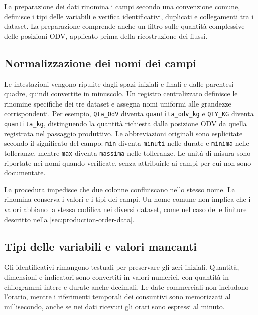 La preparazione dei dati rinomina i campi secondo una convenzione comune, definisce i tipi delle variabili e verifica identificativi, duplicati e collegamenti tra i dataset. La preparazione comprende anche un filtro sulle quantità complessive delle posizioni ODV, applicato prima della ricostruzione dei flussi.

\subsection{Normalizzazione dei nomi dei campi}
\label{sec:feature-name-normalization}

Le intestazioni vengono ripulite dagli spazi iniziali e finali e dalle parentesi quadre, quindi convertite in minuscolo. Un registro centralizzato definisce le rinomine specifiche dei tre dataset e assegna nomi uniformi alle grandezze corrispondenti. Per esempio, \texttt{Qta\_OdV} diventa \texttt{quantita\_odv\_kg} e \texttt{QTY\_KG} diventa \texttt{quantita\_kg}, distinguendo la quantità richiesta dalla posizione ODV da quella registrata nel passaggio produttivo. Le abbreviazioni originali sono esplicitate secondo il significato del campo: \texttt{min} diventa \texttt{minuti} nelle durate e \texttt{minima} nelle tolleranze, mentre \texttt{max} diventa \texttt{massima} nelle tolleranze. Le unità di misura sono riportate nei nomi quando verificate, senza attribuirle ai campi per cui non sono documentate.

La procedura impedisce che due colonne confluiscano nello stesso nome. La rinomina conserva i valori e i tipi dei campi. Un nome comune non implica che i valori abbiano la stessa codifica nei diversi dataset, come nel caso delle finiture descritto nella \cref{sec:production-order-data}.

\subsection{Tipi delle variabili e valori mancanti}
\label{sec:data-types-and-missing-values}

Gli identificativi rimangono testuali per preservare gli zeri iniziali. Quantità, dimensioni e indicatori sono convertiti in valori numerici, con quantità in chilogrammi intere e durate anche decimali. Le date commerciali non includono l'orario, mentre i riferimenti temporali dei consuntivi sono memorizzati al millisecondo, anche se nei dati ricevuti gli orari sono espressi al minuto.

